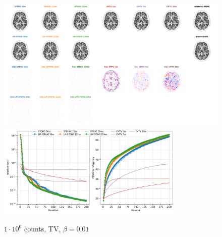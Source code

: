\begin{figure}
  \centering
    \includegraphics[width=1.0\textwidth]{./figs/brain2d_counts_1.0E+06_seed_1_beta_1.0E-02_prior_TV_niter_ref_20000_fwhm_4.5_4.5_niter_200.png}
    \includegraphics[width=0.8\textwidth]{./figs/brain2d_counts_1.0E+06_seed_1_beta_1.0E-02_prior_TV_niter_ref_20000_fwhm_4.5_4.5_niter_200_metrics.pdf}
  \caption{$1\cdot10^6$ counts, TV, $\beta = 0.01$}
\end{figure}

